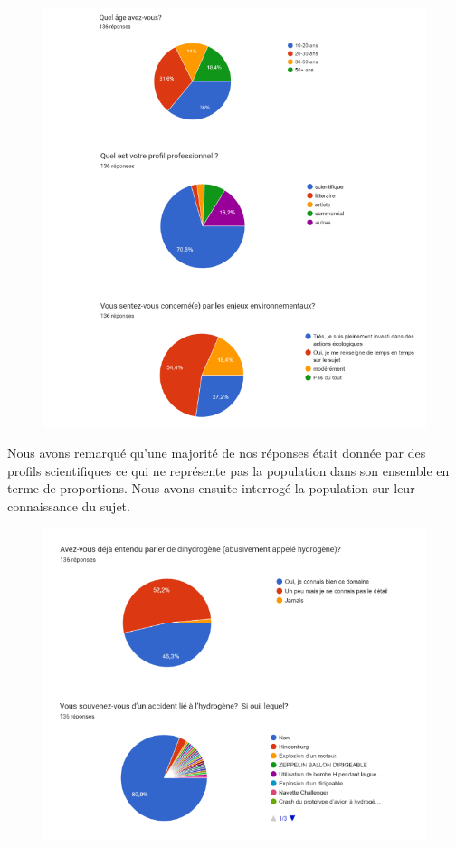 \documentclass[11pt,french,a4paper]{article}
\begin{document}
\begin{figure}[h]
\centering
\includegraphics[width=0.8\linewidth]{image/annexe/annexeacceptabilite/graph1.png}
\end{figure}

Nous avons remarqué qu’une majorité de nos réponses était donnée par des profils scientifiques ce qui ne représente pas la population dans son ensemble en terme de proportions.
Nous avons ensuite interrogé la population sur leur connaissance du sujet.

\begin{figure}[h]
\centering
\includegraphics[width=0.8\linewidth]{image/annexe/annexeacceptabilite/graph2i.png}
\end{figure}
\end{document}
